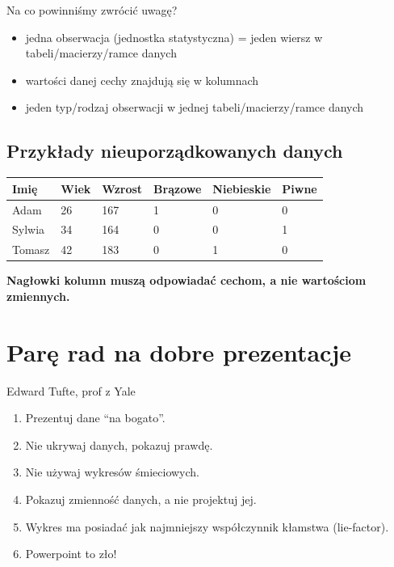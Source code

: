 \documentclass[
  letterpaper,
  DIV=11,
  numbers=noendperiod]{scrreprt}
\providecommand{\tightlist}{%
  \setlength{\itemsep}{0pt}\setlength{\parskip}{0pt}}\usepackage{longtable,booktabs,array}
\begin{document}
Na co powinniśmy zwrócić uwagę?

\begin{itemize}
\tightlist
\item
  jedna obserwacja (jednostka statystyczna) = jeden wiersz w
  tabeli/macierzy/ramce danych
\item
  wartości danej cechy znajdują się w kolumnach
\item
  jeden typ/rodzaj obserwacji w jednej tabeli/macierzy/ramce danych
\end{itemize}

\subsection{Przykłady nieuporządkowanych
danych}\label{przykux142ady-nieuporzux105dkowanych-danych}

\begin{longtable}[]{@{}llllll@{}}
\toprule\noalign{}
Imię & Wiek & Wzrost & Brązowe & Niebieskie & Piwne \\
\midrule\noalign{}
\endhead
\bottomrule\noalign{}
\endlastfoot
Adam & 26 & 167 & 1 & 0 & 0 \\
Sylwia & 34 & 164 & 0 & 0 & 1 \\
Tomasz & 42 & 183 & 0 & 1 & 0 \\
\end{longtable}

\textbf{Nagłowki kolumn muszą odpowiadać cechom, a nie wartościom
zmiennych.}

\section{Parę rad na dobre
prezentacje}\label{parux119-rad-na-dobre-prezentacje}

Edward Tufte, prof z Yale

\begin{enumerate}
\def\labelenumi{\arabic{enumi}.}
\item
  Prezentuj dane ``na bogato''.
\item
  Nie ukrywaj danych, pokazuj prawdę.
\item
  Nie używaj wykresów śmieciowych.
\item
  Pokazuj zmienność danych, a nie projektuj jej.
\item
  Wykres ma posiadać jak najmniejszy współczynnik kłamstwa (lie-factor).
\item
  Powerpoint to zło!
\end{enumerate}
\end{document}
